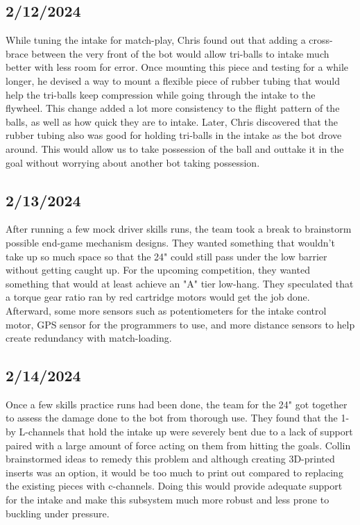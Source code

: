 \subsection{2/12/2024}
While tuning the intake for match-play, Chris found out that adding a cross-brace between the very front of the bot would allow tri-balls to intake much better with less room for error. Once mounting this piece and testing for a while longer, he 
devised a way to mount a flexible piece of rubber tubing that would help the tri-balls keep compression while going through the intake to the flywheel. This change added a lot more consistency to the flight pattern of the balls, as well as how quick they are to intake. Later, Chris discovered that the rubber tubing also was good for holding tri-balls in the intake as the bot drove around. This would allow us to take possession of 
the ball and outtake it in the goal without worrying about another bot taking possession.
\subsection{2/13/2024}
After running a few mock driver skills runs, the team took a break to brainstorm possible end-game mechanism designs. 
They wanted something that wouldn't take up so much space so that the 24" could still pass under the low barrier without getting caught up. 
For the upcoming competition, they wanted something that would at least achieve an "A" tier low-hang. They speculated that a torque gear ratio ran by 
red cartridge motors would get the job done. Afterward, some more sensors such as potentiometers for the intake control motor, GPS sensor for the programmers to use, and more distance sensors to help create redundancy with match-loading.
\subsection{2/14/2024}
Once a few skills practice runs had been done, the team for the 24" got together to assess the damage done to the bot from thorough use. They found that the 1-by L-channels that hold the intake up were severely bent due to a lack of support paired with a large amount of force acting on them from hitting the goals. 
Collin brainstormed ideas to remedy this problem and although creating 3D-printed inserts was an option, it would be too much to print out compared to replacing the existing pieces with c-channels. Doing this would provide adequate support for the intake and make this subsystem much more robust and less prone to buckling under pressure.
